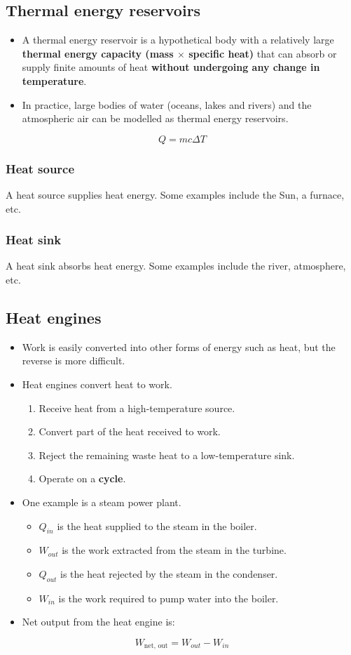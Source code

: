 \documentclass[11pt]{article}
\begin{document}
\subsection{Thermal energy reservoirs}
\label{sec:org8adbf6d}
\begin{itemize}
\item A thermal energy reservoir is a hypothetical body with a relatively large \textbf{thermal energy capacity (mass \(\boldsymbol{\times}\) specific heat)} that can absorb or supply finite amounts of heat \textbf{without undergoing any change in temperature}.
\item In practice, large bodies of water (oceans, lakes and rivers) and the atmospheric air can be modelled as thermal energy reservoirs.
\end{itemize}
\[Q = mc \Delta T\]
\subsubsection{Heat source}
\label{sec:orgfcb4cf4}
A heat source supplies heat energy. Some examples include the Sun, a furnace, etc.
\subsubsection{Heat sink}
\label{sec:orgcfd42cf}
A heat sink absorbs heat energy. Some examples include the river, atmosphere, etc.
\subsection{Heat engines}
\label{sec:org48ead18}
\begin{itemize}
\item Work is easily converted into other forms of energy such as heat, but the reverse is more difficult.
\item Heat engines convert heat to work.
\begin{enumerate}
\item Receive heat from a high-temperature source.
\item Convert part of the heat received to work.
\item Reject the remaining waste heat to a low-temperature sink.
\item Operate on a \textbf{cycle}.
\end{enumerate}
\item One example is a steam power plant.
\begin{itemize}
\item \(Q_{in}\) is the heat supplied to the steam in the boiler.
\item \(W_{out}\) is the work extracted from the steam in the turbine.
\item \(Q_{out}\) is the heat rejected by the steam in the condenser.
\item \(W_{in}\) is the work required to pump water into the boiler.
\end{itemize}
\item Net output from the heat engine is:
\end{itemize}
\[W_{\text{net, out}} = W_{out} - W_{in}\]
\end{document}
